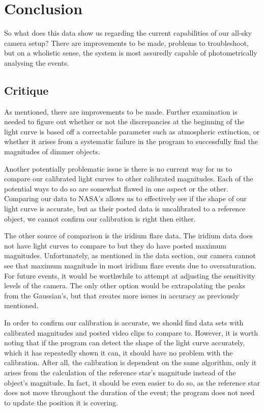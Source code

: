 \chapter{Conclusion}

So what does this data show us regarding the current capabilities of our all-sky camera setup? There are improvements to be made, problems to troubleshoot, but on a wholistic sense, the system is most assuredly capable of photometrically analysing the events.

\section{Critique}

As mentioned, there are improvements to be made. Further examination is needed to figure out whether or not the discrepancies at the beginning of the light curve is based off a correctable parameter such as atmospheric extinction, or whether it arises from a systematic failure in the program to successfully find the magnitudes of dimmer objects.

Another potentially problematic issue is there is no current way for us to compare our calibrated light curves to other calibrated magnitudes. Each of the potential ways to do so are somewhat flawed in one aspect or the other. Comparing our data to NASA's allows us to effectively see if the shape of our light curve is accurate, but as their posted data is uncalibrated to a reference object, we cannot confirm our calibration is right then either.

The other source of comparison is the iridium flare data. The iridium data does not have light curves to compare to but they do have posted maximum magnitudes. Unfortunately, as mentioned in the data section, our camera cannot see that maximum magnitude in most iridium flare events due to oversaturation. For future events, it would be worthwhile to attempt at adjusting the sensitivity levels of the camera. The only other option would be extrapolating the peaks from the Gaussian's, but that creates more issues in accuracy as previously mentioned.

In order to confirm our calibration is accurate, we should find data sets with calibrated magnitudes and posted video clips to compare to. However, it is worth noting that if the program can detect the shape of the light curve accurately, which it has repeatedly shown it can, it should have no problem with the calibration. After all, the calibration is dependent on the same algorithm, only it arises from the calculation of the reference star's magnitude instead of the object's magnitude. In fact, it should be even easier to do so, as the reference star does not move throughout the duration of the event; the program does not need to update the position it is covering.

